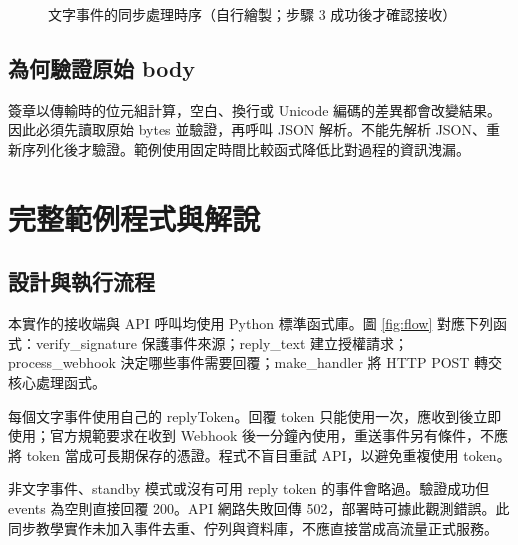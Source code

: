 \documentclass[12pt,a4paper]{report}
\begin{document}
\begin{figure}[htbp]
\centering
{}
\caption{文字事件的同步處理時序（自行繪製；步驟 3 成功後才確認接收）}\label{fig:sequence}
\end{figure}

\section{為何驗證原始 body}
簽章以傳輸時的位元組計算，空白、換行或 Unicode 編碼的差異都會改變結果。因此必須先讀取原始 bytes 並驗證，再呼叫 JSON 解析。不能先解析 JSON、重新序列化後才驗證。範例使用固定時間比較函式降低比對過程的資訊洩漏。
\clearpage
\chapter{完整範例程式與解說}
\section{設計與執行流程}
本實作的接收端與 API 呼叫均使用 Python 標準函式庫。圖 \ref{fig:flow} 對應下列函式：verify\_signature 保護事件來源；reply\_text 建立授權請求；process\_webhook 決定哪些事件需要回覆；make\_handler 將 HTTP POST 轉交核心處理函式。

每個文字事件使用自己的 replyToken。回覆 token 只能使用一次，應收到後立即使用；官方規範要求在收到 Webhook 後一分鐘內使用，重送事件另有條件，不應將 token 當成可長期保存的憑證。程式不盲目重試 API，以避免重複使用 token。

非文字事件、standby 模式或沒有可用 reply token 的事件會略過。驗證成功但 events 為空則直接回覆 200。API 網路失敗回傳 502，部署時可據此觀測錯誤。此同步教學實作未加入事件去重、佇列與資料庫，不應直接當成高流量正式服務。
\end{document}
